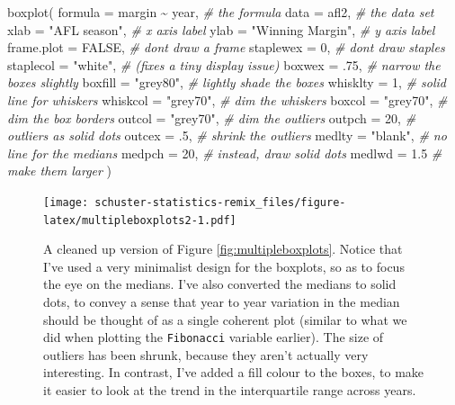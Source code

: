 \documentclass[
]{book}
\newenvironment{Shaded}{\begin{snugshade}}{\end{snugshade}}
\newcommand{\AttributeTok}[1]{\textcolor[rgb]{0.77,0.63,0.00}{#1}}
\newcommand{\CommentTok}[1]{\textcolor[rgb]{0.56,0.35,0.01}{\textit{#1}}}
\newcommand{\ConstantTok}[1]{\textcolor[rgb]{0.00,0.00,0.00}{#1}}
\newcommand{\DecValTok}[1]{\textcolor[rgb]{0.00,0.00,0.81}{#1}}
\newcommand{\FloatTok}[1]{\textcolor[rgb]{0.00,0.00,0.81}{#1}}
\newcommand{\FunctionTok}[1]{\textcolor[rgb]{0.00,0.00,0.00}{#1}}
\newcommand{\NormalTok}[1]{#1}
\newcommand{\SpecialCharTok}[1]{\textcolor[rgb]{0.00,0.00,0.00}{#1}}
\newcommand{\StringTok}[1]{\textcolor[rgb]{0.31,0.60,0.02}{#1}}
\begin{document}
\begin{Shaded}
\begin{Highlighting}[]
\FunctionTok{boxplot}\NormalTok{( }\AttributeTok{formula =}\NormalTok{  margin }\SpecialCharTok{\textasciitilde{}}\NormalTok{ year,   }\CommentTok{\# the formula}
           \AttributeTok{data =}\NormalTok{ afl2,                }\CommentTok{\# the data set}
           \AttributeTok{xlab =} \StringTok{"AFL season"}\NormalTok{,        }\CommentTok{\# x axis label}
           \AttributeTok{ylab =} \StringTok{"Winning Margin"}\NormalTok{,    }\CommentTok{\# y axis label}
           \AttributeTok{frame.plot =} \ConstantTok{FALSE}\NormalTok{,         }\CommentTok{\# don\textquotesingle{}t draw a frame}
           \AttributeTok{staplewex =} \DecValTok{0}\NormalTok{,              }\CommentTok{\# don\textquotesingle{}t draw staples}
           \AttributeTok{staplecol =} \StringTok{"white"}\NormalTok{,        }\CommentTok{\# (fixes a tiny display issue)}
           \AttributeTok{boxwex =}\NormalTok{ .}\DecValTok{75}\NormalTok{,               }\CommentTok{\# narrow the boxes slightly}
           \AttributeTok{boxfill =} \StringTok{"grey80"}\NormalTok{,         }\CommentTok{\# lightly shade the boxes}
           \AttributeTok{whisklty =} \DecValTok{1}\NormalTok{,               }\CommentTok{\# solid line for whiskers }
           \AttributeTok{whiskcol =} \StringTok{"grey70"}\NormalTok{,        }\CommentTok{\# dim the whiskers}
           \AttributeTok{boxcol =} \StringTok{"grey70"}\NormalTok{,          }\CommentTok{\# dim the box borders}
           \AttributeTok{outcol =} \StringTok{"grey70"}\NormalTok{,          }\CommentTok{\# dim the outliers}
           \AttributeTok{outpch =} \DecValTok{20}\NormalTok{,                }\CommentTok{\# outliers as solid dots}
           \AttributeTok{outcex =}\NormalTok{ .}\DecValTok{5}\NormalTok{,                }\CommentTok{\# shrink the outliers}
           \AttributeTok{medlty =} \StringTok{"blank"}\NormalTok{,           }\CommentTok{\# no line for the medians}
           \AttributeTok{medpch =} \DecValTok{20}\NormalTok{,                }\CommentTok{\# instead, draw solid dots}
           \AttributeTok{medlwd =} \FloatTok{1.5}                \CommentTok{\# make them larger}
\NormalTok{ )}
\end{Highlighting}
\end{Shaded}

\begin{figure}
\centering
\texttt{[image: schuster-statistics-remix\_files/figure-latex/multipleboxplots2-1.pdf]}
\caption{\label{fig:multipleboxplots2}A cleaned up version of Figure \ref{fig:multipleboxplots}. Notice that I've used a very minimalist design for the boxplots, so as to focus the eye on the medians. I've also converted the medians to solid dots, to convey a sense that year to year variation in the median should be thought of as a single coherent plot (similar to what we did when plotting the \texttt{Fibonacci} variable earlier). The size of outliers has been shrunk, because they aren't actually very interesting. In contrast, I've added a fill colour to the boxes, to make it easier to look at the trend in the interquartile range across years.}
\end{figure}
\end{document}
